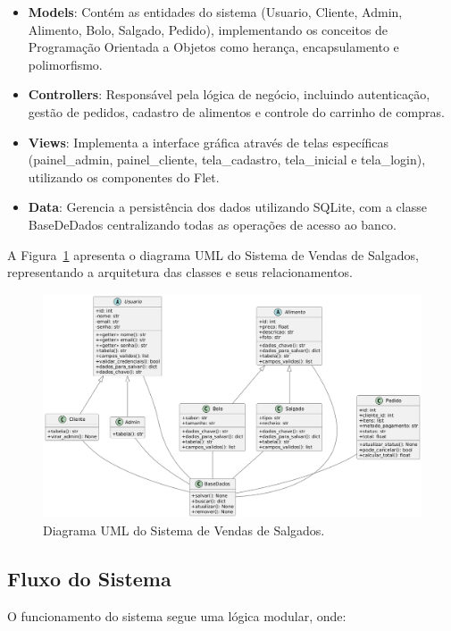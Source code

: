 \documentclass[conference]{IEEEtran}
\begin{document}
\begin{itemize}
    \item \textbf{Models}: Contém as entidades do sistema (Usuario, Cliente, Admin, Alimento, Bolo, Salgado, Pedido), implementando os conceitos de Programação Orientada a Objetos como herança, encapsulamento e polimorfismo.
    
    \item \textbf{Controllers}: Responsável pela lógica de negócio, incluindo autenticação, gestão de pedidos, cadastro de alimentos e controle do carrinho de compras.
    
    \item \textbf{Views}: Implementa a interface gráfica através de telas específicas (painel\_admin, painel\_cliente, tela\_cadastro, tela\_inicial e tela\_login), utilizando os componentes do Flet.
    
    \item \textbf{Data}: Gerencia a persistência dos dados utilizando SQLite, com a classe BaseDeDados centralizando todas as operações de acesso ao banco.
\end{itemize}
A Figura~\ref{fig:uml} apresenta o diagrama UML do Sistema de Vendas de Salgados, representando a arquitetura das classes e seus relacionamentos.

\begin{figure}[h]
    \centering
    \includegraphics[width=0.9\linewidth]{UMLrelatorio_projeto_salgados.png}
    \caption{Diagrama UML do Sistema de Vendas de Salgados.}
    \label{fig:uml}
\end{figure}
\subsection{Fluxo do Sistema}
O funcionamento do sistema segue uma lógica modular, onde:
\end{document}
